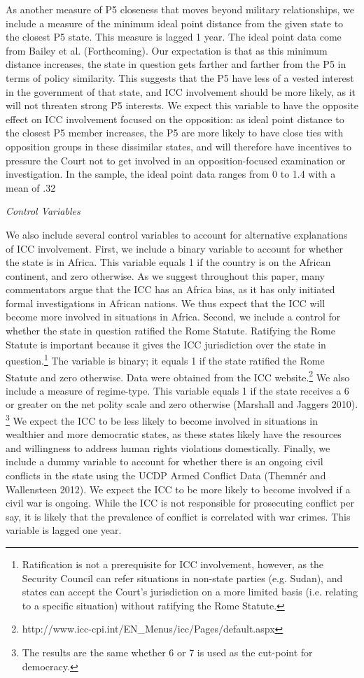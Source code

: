 As another measure of P5 closeness that moves beyond military relationships, we include a measure of the minimum ideal point distance from the given state to the closest P5 state. This measure is lagged 1 year. The ideal point data come from Bailey et al. (Forthcoming). Our expectation is that as this minimum distance increases, the state in question gets farther and farther from the P5 in terms of policy similarity. This suggests that the P5 have less of a vested interest in the government of that state, and ICC involvement should be more likely, as it will not threaten strong P5 interests. We expect this variable to have the opposite effect on ICC involvement focused on the opposition: as ideal point distance to the closest P5 member increases, the P5 are more likely to have close ties with opposition groups in these dissimilar states, and will therefore have incentives to pressure the Court not to get involved in an opposition-focused examination or investigation. In the sample, the ideal point data ranges from 0 to 1.4 with a mean of .32

\emph{Control Variables }

We also include several control variables to account for alternative explanations of ICC involvement. First, we include a binary variable to account for whether the state is in Africa. This variable equals 1 if the country is on the African continent, and zero otherwise. As we suggest throughout this paper, many commentators argue that the ICC has an Africa bias, as it has only initiated formal investigations in African nations. We thus expect that the ICC will become more involved in situations in Africa. Second, we include a control for whether the state in question ratified the Rome Statute. Ratifying the Rome Statute is important because it gives the ICC jurisdiction over the state in question.\footnote{Ratification is not a prerequisite for ICC involvement, however, as the Security Council can refer situations in non-state parties (e.g. Sudan), and states can accept the Court's jurisdiction on a more limited basis (i.e. relating to a specific situation) without ratifying the Rome Statute.} The variable is binary; it equals 1 if the state ratified the Rome Statute and zero otherwise. Data were obtained from the ICC website.\footnote{http://www.icc-cpi.int/EN\_Menus/icc/Pages/default.aspx} We also include a measure of regime-type. This variable equals 1 if the state receives a 6 or greater on the net polity scale and zero otherwise (Marshall and Jaggers 2010). \footnote{The results are the same whether 6 or 7 is used as the cut-point for democracy.} We expect the ICC to be less likely to become involved in situations in wealthier and more democratic states, as these states likely have the resources and willingness to address human rights violations domestically. Finally, we include a dummy variable to account for whether there is an ongoing civil conflicts in the state using the UCDP Armed Conflict Data (Themnér and Wallensteen 2012). We expect the ICC to be more likely to become involved if a civil war is ongoing. While the ICC is not responsible for prosecuting conflict per say, it is likely that the prevalence of conflict is correlated with war crimes. This variable is lagged one year.